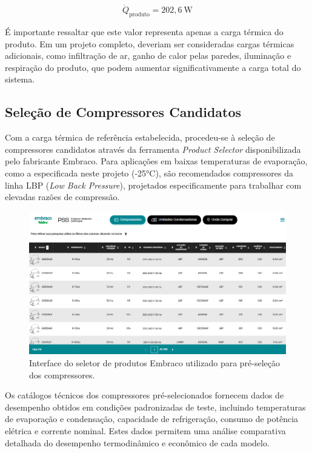 \begin{equation}
    \dot{Q}_{\text{produto}} = 202,6~\text{W}
    \label{carga}
\end{equation}

É importante ressaltar que este valor representa apenas a carga térmica do produto. Em um projeto completo, deveriam ser consideradas cargas térmicas adicionais, como infiltração de ar, ganho de calor pelas paredes, iluminação e respiração do produto, que podem aumentar significativamente a carga total do sistema.

\subsection{Seleção de Compressores Candidatos}

Com a carga térmica de referência estabelecida, procedeu-se à seleção de compressores candidatos através da ferramenta \textit{Product Selector} disponibilizada pelo fabricante Embraco. Para aplicações em baixas temperaturas de evaporação, como a especificada neste projeto (-25°C), são recomendados compressores da linha LBP (\textit{Low Back Pressure}), projetados especificamente para trabalhar com elevadas razões de compressão.

\begin{figure}[ht]
    \centering
    \includegraphics[width=0.8\linewidth]{Imagens/Desenvolvimento/PSS-embraco.png}
    \caption{Interface do seletor de produtos Embraco utilizado para pré-seleção dos compressores.}
    \label{fig:seletor de produtos}
\end{figure}

Os catálogos técnicos dos compressores pré-selecionados fornecem dados de desempenho obtidos em condições padronizadas de teste, incluindo temperaturas de evaporação e condensação, capacidade de refrigeração, consumo de potência elétrica e corrente nominal. Estes dados permitem uma análise comparativa detalhada do desempenho termodinâmico e econômico de cada modelo.

